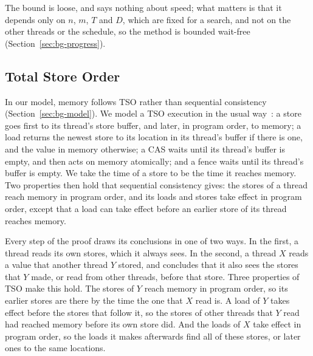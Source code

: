 The bound is loose, and says nothing about speed; what matters is that it depends only on $n$, $m$, $T$ and $D$, which are fixed for a search, and not on the other threads or the schedule, so the method is bounded wait-free (Section~\ref{sec:bg-progress}).

\subsection{Total Store Order}
\label{sec:pf-tso}

In our model, memory follows TSO rather than sequential consistency (Section~\ref{sec:bg-model}). We model a TSO execution in the usual way~\cite{x86tso}: a store goes first to its thread's store buffer, and later, in program order, to memory; a load returns the newest store to its location in its thread's buffer if there is one, and the value in memory otherwise; a CAS waits until its thread's buffer is empty, and then acts on memory atomically; and a fence waits until its thread's buffer is empty. We take the time of a store to be the time it reaches memory. Two properties then hold that sequential consistency gives: the stores of a thread reach memory in program order, and its loads and stores take effect in program order, except that a load can take effect before an earlier store of its thread reaches memory.

Every step of the proof draws its conclusions in one of two ways. In the first, a thread reads its own stores, which it always sees. In the second, a thread $X$ reads a value that another thread $Y$ stored, and concludes that it also sees the stores that $Y$ made, or read from other threads, before that store. Three properties of TSO make this hold. The stores of $Y$ reach memory in program order, so its earlier stores are there by the time the one that $X$ read is. A load of $Y$ takes effect before the stores that follow it, so the stores of other threads that $Y$ read had reached memory before its own store did. And the loads of $X$ take effect in program order, so the loads it makes afterwards find all of these stores, or later ones to the same locations.

